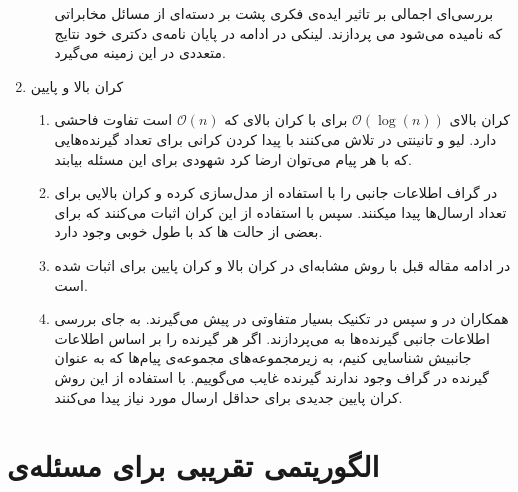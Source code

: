 \begin{enumerate}
\begin{enumerate}
	\cite{7176784}
	بررسی‌ای اجمالی بر تاثیر ایده‌ی فکری پشت
	\picod
	بر دسته‌ای از مسائل مخابراتی که
	نامیده می‌شود می پردازند. لینکی در ادامه در پایان نامه‌ی دکتری خود
	\cite{linqiphd}
	نتایج متعددی در این زمینه می‌گیرد.
		\end{enumerate}
		\item کران بالا و پایین
		\begin{enumerate}
			\item 
			کران بالای
			$\mathcal{O}(\log(n))$
			برای
			\picod
			با کران بالای
			\icod
			که
			$\mathcal{O}(n)$
			است تفاوت فاحشی دارد. لیو و تانینتی در
			\cite{7606849}
		تلاش می‌کنند با پیدا کردن کرانی برای تعداد گیرنده‌هایی که با هر پیام می‌توان ارضا کرد شهودی برای این مسئله بیابند.
			\item 
			در
			\cite{9518120}
			گراف اطلاعات جانبی را با استفاده از 
			مدل‌سازی کرده و کران بالایی برای تعداد ارسال‌ها پیدا میکنند. سپس با استفاده از این کران اثبات می‌کنند که برای بعضی از حالت ها کد با طول خوبی وجود دارد.
			\item
			در ادامه مقاله قبل با روش مشابه‌ای در
			\cite{9965883}
			کران بالا و کران پایین برای
			\picod
			اثبات شده است.
					\item
					همکاران در
			\cite{ong2019improved}
			و سپس در
			\cite{8849527}
			تکنیک بسیار متفاوتی در پیش می‌گیرند. به جای بررسی اطلاعات جانبی گیرنده‌ها به 
		می‌پردازند. اگر هر گیرنده را بر اساس اطلاعات جانبیش شناسایی کنیم، به زیرمجموعه‌های مجموعه‌ی پیام‌ها که به عنوان گیرنده در گراف وجود ندارند گیرنده غایب می‌گوییم. با استفاده از این روش کران پایین جدیدی برای حداقل ارسال مورد نیاز پیدا می‌کنند.
		\end{enumerate}
\end{enumerate}


\section{
	الگوریتمی تقریبی برای مسئله‌ی
\picod
}
\label{sec:3:3}
